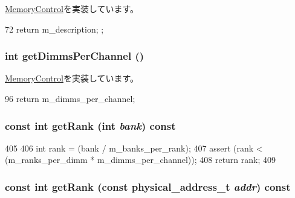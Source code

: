 \hyperlink{classMemoryControl_a907d681c378517c972b738f4286c25c5}{MemoryControl}を実装しています。


\begin{DoxyCode}
72 { return m_description; };
\end{DoxyCode}
\hypertarget{classRubyMemoryControl_a5a9c0e20c20d0171bb8d8a96cb22576f}{
\subsubsection[{getDimmsPerChannel}]{\setlength{\rightskip}{0pt plus 5cm}int getDimmsPerChannel ()}}
\label{classRubyMemoryControl_a5a9c0e20c20d0171bb8d8a96cb22576f}


\hyperlink{classMemoryControl_a6f39efbb6d1f061b2f6467ac33f6ce34}{MemoryControl}を実装しています。


\begin{DoxyCode}
96 { return m_dimms_per_channel; }
\end{DoxyCode}
\hypertarget{classRubyMemoryControl_a39abe91d99c7b551495766a397e212af}{
\subsubsection[{getRank}]{\setlength{\rightskip}{0pt plus 5cm}const int getRank (int {\em bank}) const}}
\label{classRubyMemoryControl_a39abe91d99c7b551495766a397e212af}



\begin{DoxyCode}
405 {
406     int rank = (bank / m_banks_per_rank);
407     assert (rank < (m_ranks_per_dimm * m_dimms_per_channel));
408     return rank;
409 }
\end{DoxyCode}
\hypertarget{classRubyMemoryControl_af8c39d7c9853a48fd242bda859e76222}{
\subsubsection[{getRank}]{\setlength{\rightskip}{0pt plus 5cm}const int getRank (const {\bf physical\_\-address\_\-t} {\em addr}) const}}
\label{classRubyMemoryControl_af8c39d7c9853a48fd242bda859e76222}


